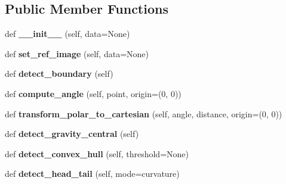 \subsection*{Public Member Functions}
\begin{DoxyCompactItemize}
\item 
\mbox{\label{class_boundary_1_1_boundary_a6247b4d78b425c10367d3b6bbded234b}} 
def {\bfseries \+\_\+\+\_\+init\+\_\+\+\_\+} (self, data=None)
\item 
\mbox{\label{class_boundary_1_1_boundary_a60c469c2931881b40a5ef38fa5752464}} 
def {\bfseries set\+\_\+ref\+\_\+image} (self, data=None)
\item 
\mbox{\label{class_boundary_1_1_boundary_a703294161d64981d0d597c08cfeff326}} 
def {\bfseries detect\+\_\+boundary} (self)
\item 
\mbox{\label{class_boundary_1_1_boundary_a73cd892392e32b15b5d8ed9cb6b2da07}} 
def {\bfseries compute\+\_\+angle} (self, point, origin=(0, 0))
\item 
\mbox{\label{class_boundary_1_1_boundary_a703539d9654591e5093d9f82b7633d12}} 
def {\bfseries transform\+\_\+polar\+\_\+to\+\_\+cartesian} (self, angle, distance, origin=(0, 0))
\item 
\mbox{\label{class_boundary_1_1_boundary_a188eb7feb48fa5148d6df32b2b275825}} 
def {\bfseries detect\+\_\+gravity\+\_\+central} (self)
\item 
\mbox{\label{class_boundary_1_1_boundary_a82aa94fdf9adb2d149940f2621fb814b}} 
def {\bfseries detect\+\_\+convex\+\_\+hull} (self, threshold=None)
\item 
\mbox{\label{class_boundary_1_1_boundary_a8128e08077518f6b66ce271f1ce46e90}} 
def {\bfseries detect\+\_\+head\+\_\+tail} (self, mode=\textquotesingle{}curvature\textquotesingle{})
\item 
\mbox{\label{class_boundary_1_1_boundary_afb0220f4e7905cc066d685198d6d7fb8}} 

\end{DoxyCompactItemize}
